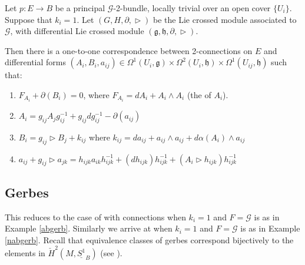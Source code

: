 \begin{theorem}
 Let $p:E\rightarrow B$ be a principal $\mathcal{G}$-2-bundle, locally trivial over an open cover $\{U_i\}$. Suppose that $k_i=1$. Let $(G,H,\partial,\vartriangleright)$ be the Lie crossed module associated to $\mathcal{G}$, with differential Lie crossed module $(\mathfrak{g},\mathfrak{h},\partial,\vartriangleright)$.

Then there is a one-to-one correspondence between 2-connections on $E$ and differential forms $(A_i,B_i,a_{ij})\in \Omega^1(U_i,\mathfrak{g})\times \Omega^2(U_i,\mathfrak{h})\times \Omega^1(U_{ij},\mathfrak{h})$ such that:
\begin{enumerate}
 \item \label{fakec} $F_{A_i}+\partial(B_i)=0$, where $F_{A_i}=dA_i+A_i\wedge A_i$ (the  of $A_i$).
\item $A_i=g_{ij}A_jg_{ij}^{-1}+g_{ij}dg_{ij}^{-1}-\partial (a_{ij})$
\item $B_i=g_{ij}\vartriangleright B_j+k_{ij}$ where $k_{ij}=da_{ij}+a_{ij}\wedge a_{ij}+d\alpha (A_i)\wedge a_{ij}$
\item $a_{ij}+g_{ij}\vartriangleright a_{jk}=h_{ijk}a_{ik}h_{ijk}^{-1}+(dh_{ijk})h_{ijk}^{-1}+(A_i\vartriangleright h_{ijk})h_{ijk}^{-1}$
\end{enumerate}
\end{theorem}



\subsection{Gerbes}
This reduces to the case of   with connections when $k_i=1$ and $F=\mathcal{G}$ is as in Example \ref{abgerb}. Similarly we arrive at  when $k_i=1$ and $F=\mathcal{G}$ is as in Example \ref{nabgerb}. Recall that equivalence classes of gerbes correspond bijectively to the elements in $\check{H}^2(M,\underline{S^1}_B)$ (see \cite[p. 10]{picken_parallel}).


